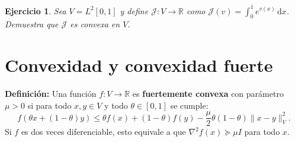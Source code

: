 \documentclass[11pt]{report}
\newtheorem{ex}{Ejercicio}
\newenvironment{solucion}{\color{blue}\textbf{Solución:}}{}
\begin{document}

\begin{ex}%
    Sea $V = L^2[0,1]$ y define $\mathcal{J}: V \to \mathbb{R}$ como $\mathcal{J}(v) = \int_0^1 e^{v(x)} \, \mathrm{d}x$. Demuestra que $\mathcal{J}$ es convexa en $V$.
\end{ex}

\section{Convexidad  y convexidad fuerte}

\textbf{Definición:} Una función \( f: V \to \mathbb{R} \) es \textbf{fuertemente convexa} con parámetro \( \mu > 0 \) si para todo \( x, y \in V \) y todo \( \theta \in [0,1] \) se cumple:
\[
f(\theta x + (1-\theta) y) \leq \theta f(x) + (1-\theta) f(y) - \frac{\mu}{2} \theta (1-\theta) \|x - y\|_V^2.
\]
Si \( f \) es dos veces diferenciable, esto equivale a que \( \nabla^2 f(x) \succeq \mu I \) para todo \( x \).

\vspace{1em}
\end{document}
